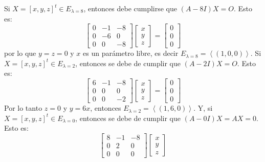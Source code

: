 \begin{solucion}
\begin{enumerate}[$a$)]
  Si $X=[x,y,z]^t \in E_{\lambda=8}$, entonces debe cumplirse que $(A-8I)X = O$. Esto es:
  \begin{equation*}
   \begin{bmatrix}
    0 & -1 & -8 \\
    0 & -6 &  0 \\
    0 &  0 & -8 
   \end{bmatrix}
   \begin{bmatrix}
    x \\ y \\ z
   \end{bmatrix}
   =
   \begin{bmatrix}
    0 \\ 0 \\ 0
   \end{bmatrix}
  \end{equation*}
  por lo que $y = z = 0$ y $x$ es un par\'ametro libre, es decir $E_{\lambda=8} = \left< (1, 0, 0) \right>$. Si $X=[x,y,z]^t \in E_{\lambda=2}$, entonces se debe de cumplir que $(A-2I)X = O$. Esto es:
  \begin{equation*}
   \begin{bmatrix}
    6 & -1 & -8 \\
    0 &  0 &  0 \\
    0 &  0 & -2
   \end{bmatrix}
   \begin{bmatrix}
    x \\ y \\ z
   \end{bmatrix}
   =
   \begin{bmatrix}
    0 \\ 0 \\ 0
   \end{bmatrix}
  \end{equation*}
  Por lo tanto $z = 0$ y $y = 6x$, entonces $E_{\lambda=2} = \left< (1, 6, 0) \right>$. Y, si $X = [x, y, z]^t \in E_{\lambda=0}$, entonces se debe de cumplir que $(A - 0I)X = AX = 0$. Esto es:
  \begin{equation*}
   \begin{bmatrix}
    8 & -1 & -8 \\
    0 &  2 &  0 \\
    0 &  0 &  0
   \end{bmatrix}
   \begin{bmatrix}
    x \\ y \\ z
   \end{bmatrix}

\end{equation*}
\end{enumerate}
\end{solucion}
